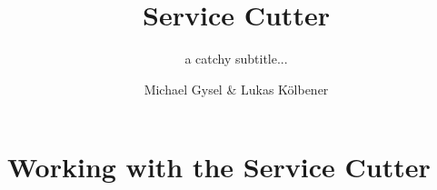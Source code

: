 \documentclass[hsr-ba,english]{hgbthesis}
\begin{document}

\bigskipamount=30pt

\title{Service Cutter}
\subtitle{a catchy subtitle...}
\author{Michael Gysel \& Lukas K\"{o}lbener}



\frontmatter
\maketitle
\setcounter{tocdepth}{1}
\tableofcontents

			

\mainmatter         %

\makeatletter
\renewcommand{\@makechapterhead}[1]{%
\vspace*{50 pt}%
{\setlength{\parindent}{0pt} \raggedright \normalfont
\bfseries\Huge\thechapter.\ #1
\par\nobreak\vspace{40 pt}}}
\makeatother











\chapter{Working with the Service Cutter}
\end{document}
